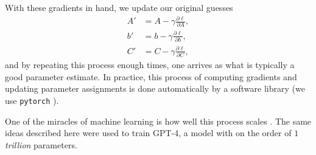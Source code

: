 With these gradients in hand, we update our original guesses
\begin{equation}
	\begin{aligned}
		A' & = A - \gamma \frac{\partial \ell}{\partial A}, \\
		b' & = b - \gamma \frac{\partial \ell}{\partial b}, \\
		C' & = C - \gamma \frac{\partial \ell}{\partial C},
	\end{aligned}
\end{equation}
and by repeating this process enough times, one arrives as what is typically a good parameter estimate. In practice, this process of computing gradients and updating parameter assignments is done automatically by a software library (we use \texttt{pytorch} \cite{pytorch}).

One of the miracles of machine learning is how well this process scales \cite[\S 13 2.6]{PML}. The same ideas described here were used to train GPT-4, a model with on the order of $1$ \emph{trillion} parameters.
